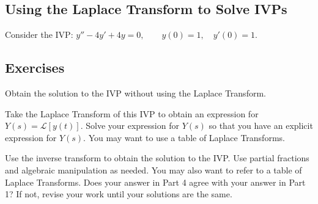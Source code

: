 \documentclass[11pt]{exam}
\begin{document}
\subsection*{Using the Laplace Transform to Solve IVPs}

Consider the IVP: $y''-4y'+4y=0,\qquad y(0)=1,\quad y'(0)=1$. 

\subsection*{Exercises}
\begin{questions}
\question[1] Obtain the solution to the IVP without using the Laplace Transform. \newpage 

\question[2] Take the Laplace Transform of this IVP to obtain an expression for $Y(s) = \mathcal{L}[y(t)]$. Solve your expression for $Y(s)$ so that you have an explicit expression for $Y(s)$. You may want to use a table of Laplace Transforms. 

\vfill

\question[1] Use the inverse transform to obtain the solution to the IVP. Use partial fractions and algebraic manipulation as needed. You may also want to refer to a table of Laplace Transforms. Does your answer in Part 4 agree with your answer in Part 1? If not, revise your work until your solutions are the same. 

    \vfill

\end{questions}
\end{document}
